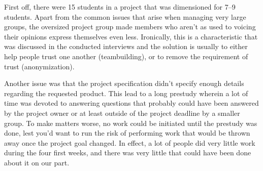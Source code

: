 First off, there were 15 students in a project that was dimensioned for 7--9 students. Apart from the common issues that arise when managing very large groups, the oversized project group made members who aren't as used to voicing their opinions express themselves even less. Ironically, this is a characteristic that was discussed in the conducted interviews and the solution is usually to either help people trust one another (teambuilding), or to remove the requirement of trust (anonymization). 

Another issue was that the project specification didn't specify enough details regarding the requested product. This lead to a long prestudy wherein a lot of time was devoted to answering questions that probably could have been answered by the project owner or at least outside of the project deadline by a smaller group. To make matters worse, no work could be initiated until the prestudy was done, lest you'd want to run the risk of performing work that would be thrown away once the project goal changed. In effect, a lot of people did very little work during the four first weeks, and there was very little that could have been done about it on our part.




